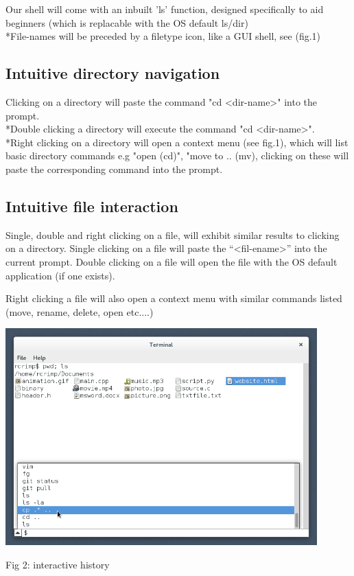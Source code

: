 \documentclass[a4paper,11pt]{article}
\begin{document}
Our shell will come with an inbuilt 'ls' function, designed specifically to aid beginners
(which is replacable with the OS default ls/dir)
\\*File-names will be preceded by a filetype icon, like a GUI shell, see (fig.1)

\subsection*{Intuitive directory navigation}
Clicking on a directory will paste the command "cd \textless dir-name\textgreater" into the prompt.
\\*Double clicking a directory will execute the command "cd \textless dir-name\textgreater".
\\*Right clicking on a directory will open a context menu (see fig.1), which will list basic directory commands e.g "open (cd)", "move to .. (mv), clicking on these will paste the corresponding command into the prompt.
\subsection*{Intuitive file interaction}
Single, double and right clicking on a file, will exhibit similar results to clicking on a directory.
Single clicking on a file will paste the ``\textless fil-ename\textgreater'' into the current prompt.
Double clicking on a file will open the file with the OS default application (if one exists).

Right clicking a file will also  open a context menu with similar commands listed (move, rename, delete, open etc....)


\begin{center}\includegraphics[width=12cm]{history.png}

Fig 2: interactive history\end{center}
\end{document}
